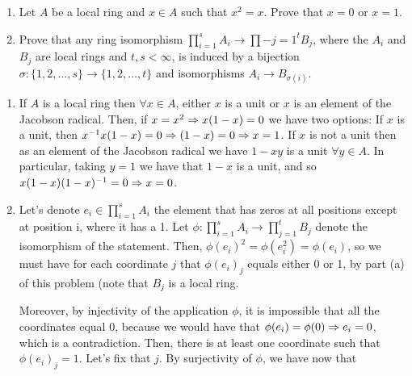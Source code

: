 \begin{ex}
	\begin{enumerate}[label=\alph*)]
		\item Let $A$ be a local ring and $x \in A$ such that $x^2 = x$. Prove that $x = 0$ or $x = 1$.
		\item Prove that any ring isomorphism $\prod_{i = 1}^s A_i \to \prod-{j = 1}^t B_j$, where the $A_i$ and $B_j$ are local rings and $t,s < \infty$, is induced by a bijection $\sigma: \{1,2,\dots, s\} \to \{1,2,\dots, t\}$ and isomorphisms $A_i \to B_{\sigma(i)}$.
	\end{enumerate}
\end{ex}

\begin{sol}
	\begin{enumerate}[label=\alph*)]
		\item If $A$ is a local ring then $\forall x \in A$, either $x$ is a unit or $x$ is an element of the Jacobson radical. Then, if $x = x^2 \Rightarrow x(1-x) = 0$ we have two options: If $x$ is a unit, then $x^{-1}x(1-x) = 0 \Rightarrow (1-x) = 0 \Rightarrow x = 1$. If $x$ is not a unit then as an element of the Jacobson radical we have $1-xy$ is a unit $\forall y \in A$. In particular, taking $y = 1$ we have that $1-x$ is a unit, and so $x(1-x)(1-x)^{-1} = 0 \Rightarrow x = 0$.
		
		\item Let's denote $e_i \in \prod_{i = 1}^s A_i$ the element that has zeros at all positions except at position i, where it has a 1. Let $\phi: \prod_{i = 1}^s A_i \to \prod_{j = 1}^t B_j$ denote the isomorphism of the statement. Then, $\phi(e_i)^2 = \phi(e_i^2) = \phi(e_i)$, so we must have for each coordinate $j$ that $\phi(e_i)_j$ equals either 0 or 1, by part (a) of this problem (note that $B_j$ is a local ring.

		Moreover, by injectivity of the application $\phi$, it is impossible that all the coordinates equal $0$, because we would have that $\phi(e_i) = \phi(0) \Rightarrow e_i = 0$, which is a contradiction. Then, there is at least one coordinate such that $\phi(e_i)_j = 1$. Let's fix that $j$. By surjectivity of $\phi$, we have now that  
	\end{enumerate}
\end{sol}